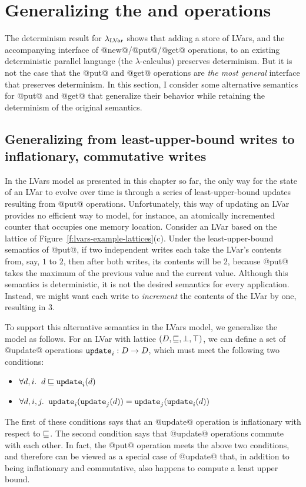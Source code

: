 \section{Generalizing the  and  operations}\label{s:lvars-generalizing}

The determinism result for $\lambda_{\textrm{LVar}}$ shows that adding a store of
LVars, and the accompanying interface of @new@/@put@/@get@ operations,
to an existing deterministic parallel language (the
$\lambda$-calculus) preserves determinism.  But it is not the case
that the @put@ and @get@ operations are \emph{the most general}
interface that preserves determinism.  In this section, I consider
some alternative semantics for @put@ and @get@ that generalize their
behavior while retaining the determinism of the original semantics.

\subsection{Generalizing from least-upper-bound writes to inflationary, commutative writes}\label{subsection:lvars-generalizing-from-least-upper-bound-writes}

In the LVars model as presented in this chapter so far, the only way
for the state of an LVar to evolve over time is through a series of
least-upper-bound updates resulting from @put@ operations.
Unfortunately, this way of updating an LVar provides no efficient way
to model, for instance, an atomically incremented counter that
occupies one memory location.  Consider an LVar based on the lattice
of Figure~\ref{f:lvars-example-lattices}(c).  Under the
least-upper-bound semantics of @put@, if two independent writes each
take the LVar's contents from, say, $1$ to $2$, then after both
writes, its contents will be $2$, because @put@ takes the maximum of
the previous value and the current value.  Although this semantics is
deterministic, it is not the desired semantics for every application.
Instead, we might want each write to \emph{increment} the contents of
the LVar by one, resulting in $3$.

To support this alternative semantics in the LVars model, we
generalize the model as follows.  For an LVar with lattice $(D,
\sqsubseteq, \bot, \top)$, we can define a set of @update@ operations
$\mbox{\texttt{update}}_i : D \rightarrow D$, which must meet the following two
conditions:
\begin{itemize}
\item $\forall d, i.     \;\; d \sqsubseteq \mbox{\texttt{update}}_i(d) $
\item $\forall d, i, j.  \;\; \mbox{\texttt{update}}_i(\mbox{\texttt{update}}_j(d)) = \mbox{\texttt{update}}_j(\mbox{\texttt{update}}_i(d)) $
\end{itemize}
The first of these conditions says that an @update@ operation is
inflationary with respect to $\sqsubseteq$.  The second condition says
that @update@ operations commute with each other.  In fact, the @put@
operation meets the above two conditions, and therefore can be viewed
as a special case of @update@ that, in addition to being inflationary
and commutative, also happens to compute a least upper bound.

